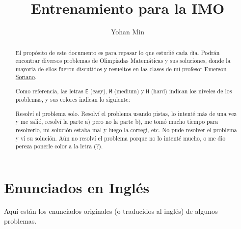 \documentclass[11pt]{scrartcl}
\title{Entrenamiento para la IMO}
\author{Yohan Min}
\begin{document}
\maketitle

\begin{abstract}
	El propósito de este documento es para repasar lo que estudié cada día. Podrán encontrar diversos problemas de Olimpiadas Matemáticas y sus soluciones, donde la mayoría de ellos fueron discutidos y resueltos en las clases de mi profesor \href{https://www.facebook.com/emerson.sorianoperez}{Emerson Soriano}.
	
	Como referencia, las letras \verb|E| (easy), \verb|M| (medium) y \verb|H| (hard) indican los niveles de los problemas, y sus colores indican lo siguiente:
	\begin{description}[labelwidth=\widthof{\texttt{aaaaa}}+1.2em,leftmargin=\widthof{\texttt{aaaaa}a}+1.2em,align=right]
		 Resolví el problema solo.
		 Resolví el problema usando pistas, lo intenté más de una vez y me salió, resolví la parte a) pero no la parte b), me tomó mucho tiempo para resolverlo, mi solución estaba mal y luego la corregí, etc.
		 No pude resolver el problema y vi su solución.
		 Aún no resolví el problema porque no lo intenté mucho, o me dio pereza ponerle color a la letra (?).
	\end{description}
\end{abstract}

\tableofcontents



















\section{Enunciados en Inglés}

Aquí están los enunciados originales (o traducidos al inglés) de algunos problemas.

\makehints
\clearpage
\printbibliography
\end{document}
